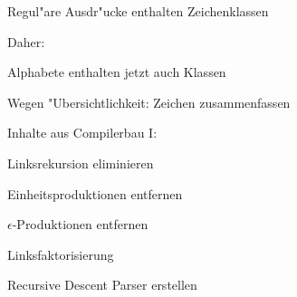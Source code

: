 {
\begin{itemgroup}{}
   \item Regul"are Ausdr"ucke enthalten Zeichenklassen
   
   \item Daher:
   \begin{itemgroup}{}
      \item Alphabete enthalten jetzt auch Klassen
   \end{itemgroup}
   
   \item Wegen "Ubersichtlichkeit: Zeichen zusammenfassen
\end{itemgroup}
\vfill{}
}

{
\begin{itemgroup}{}
   \item Inhalte aus Compilerbau I:
   \begin{itemgroup}{}
      \item Linksrekursion eliminieren
      
      \item Einheitsproduktionen entfernen
      
      \item $\epsilon$-Produktionen entfernen
      
      \item Linksfaktorisierung
      
      \item Recursive Descent Parser erstellen
   \end{itemgroup}
\end{itemgroup}
\vfill{}
}

